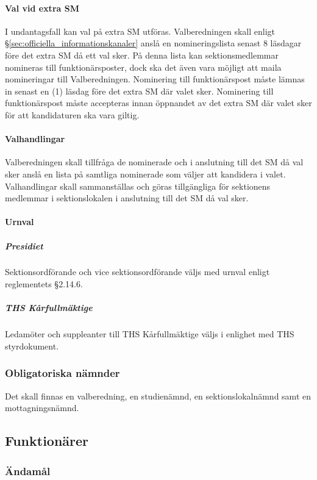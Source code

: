\documentclass{dgovdoc}
\begin{document}
\paragraph{Val vid extra SM}
I undantagsfall kan val på extra SM utföras. Valberedningen skall enligt \S\ref{sec:officiella_informationskanaler} anslå en
nomineringslista senast 8 läsdagar före det extra SM då ett val sker. På denna lista kan
sektionsmedlemmar nomineras till funktionärsposter, dock ska det även vara möjligt att
maila nomineringar till Valberedningen. Nominering till funktionärspost måste lämnas
in senast en (1) läsdag före det extra SM där valet sker. Nominering till funktionärspost
måste accepteras innan öppnandet av det extra SM där valet sker för att kandidaturen
ska vara giltig.

\paragraph{Valhandlingar}
Valberedningen skall tillfråga de nominerade och i anslutning till det SM då val sker
anslå en lista på samtliga nominerade som väljer att kandidera i valet. Valhandlingar
skall sammanställas och göras tillgängliga för sektionens medlemmar i sektionslokalen
i anslutning till det SM då val sker.

\paragraph{Urnval}

\subparagraph{Presidiet}
Sektionsordförande och vice sektionsordförande väljs med urnval enligt reglementets \S2.14.6.

\subparagraph{THS Kårfullmäktige}
Ledamöter och suppleanter till THS Kårfullmäktige väljs i enlighet med THS
styrdokument.

\subsubsection{Obligatoriska nämnder}

Det skall finnas en valberedning, en studienämnd, en sektionslokalnämnd samt en
mottagningsnämnd.

\subsection{Funktionärer}

\subsubsection{Ändamål}
\end{document}
